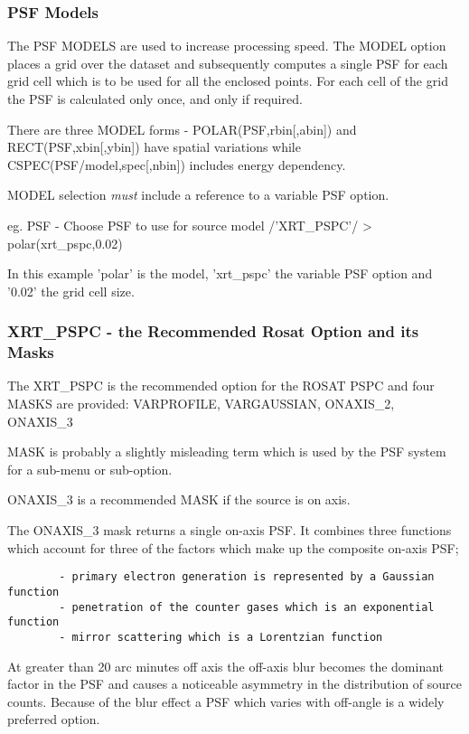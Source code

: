 \documentclass[11pt,fleqn]{article}    %
\begin{document}
\subsubsection{PSF Models}

The PSF   MODELS are  used  to increase processing  speed.   The MODEL
option places a  grid over the dataset  and subsequently  computes a single
PSF for each grid cell which is to be used for all the enclosed points.
For each cell of the grid the PSF is calculated only once, and only if required.

There   are   three    MODEL      forms  -    POLAR(PSF,rbin[,abin])    and
RECT(PSF,xbin[,ybin])        have      spatial         variations while
CSPEC(PSF/model,spec[,nbin])  includes  energy  dependency.     

MODEL selection {\it must} include a reference to a variable PSF option.

eg.  PSF  -    Choose PSF   to use   for    source  model /'XRT_PSPC'/    >
polar(xrt_pspc,0.02)  

In this example 'polar' is the model,  'xrt_pspc' the variable PSF option and
'0.02' the grid cell size.

\subsubsection{XRT\_PSPC - the Recommended Rosat Option and its Masks}
 
The XRT\_PSPC is  the recommended option for the  ROSAT PSPC and four MASKS
are provided: VARPROFILE, VARGAUSSIAN, ONAXIS\_2, ONAXIS\_3

MASK is probably a slightly misleading term which is used by the PSF system
for a sub-menu or sub-option.

ONAXIS\_3 is a recommended MASK if the source  is on  axis.  

The  ONAXIS\_3  mask returns a   single  on-axis PSF.  It  combines three
functions which account    for three of the  factors   which  make up   the
composite on-axis PSF;
\begin{verbatim}
        - primary electron generation is represented by a Gaussian function
        - penetration of the counter gases which is an exponential function
        - mirror scattering which is a Lorentzian function
\end{verbatim}      
        
At greater  than 20 arc   minutes off axis the  off-axis  blur becomes  the
dominant  factor  in the  PSF   and causes  a  noticeable asymmetry  in the
distribution   of source counts.  Because  of the  blur  effect a PSF which
varies with off-angle is a widely preferred option.
\end{document}

